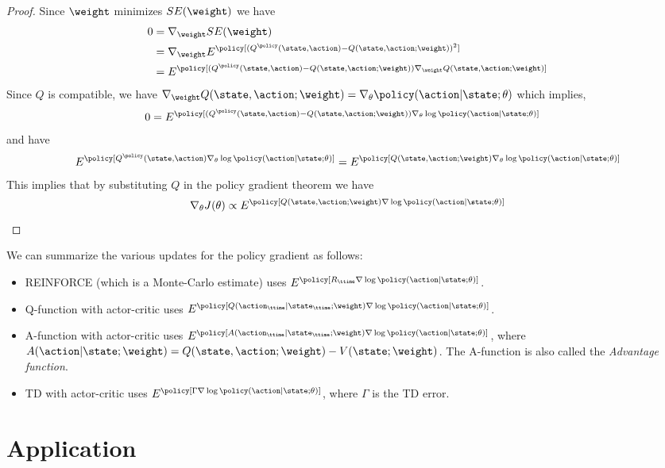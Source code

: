 \begin{proof}
Since $\weight$ minimizes $SE(\weight)$ we have
\begin{align*}
0 & = \nabla_\weight SE(\weight)\\
&= \nabla_\weight E^\policy[(Q^\policy(\state,\action)-Q(\state,\action;\weight))^2]\\
&=
E^\policy[(Q^\policy(\state,\action)-Q(\state,\action;\weight))\nabla_\weight
Q(\state,\action;\weight)]
\end{align*}
Since $Q$ is compatible, we have $\nabla_\weight
Q(\state,\action;\weight)= \nabla_\theta
\policy(\action|\state;\theta)$ which implies,
\begin{align*}
0&=
E^\policy[(Q^\policy(\state,\action)-Q(\state,\action;\weight))\nabla_\theta
\log \policy(\action|\state;\theta)]
\end{align*}
and have
\begin{align*}
 E^\policy[Q^\policy(\state,\action)\nabla_\theta \log \policy(\action|\state;\theta)] = E^\policy[Q(\state,\action;\weight)\nabla_\theta \log \policy(\action|\state;\theta)]
\end{align*}
This implies that by substituting $Q$ in the policy gradient theorem
we have
\[
\nabla_\theta J(\theta) \propto E^\policy[Q(\state,\action;\weight)
\nabla \log \policy(\action|\state;\theta)]
\]
\end{proof}

We can summarize the various updates for the policy gradient as
follows:
\begin{itemize}
\item REINFORCE (which is a Monte-Carlo estimate) uses
$E^\policy[R_\ttime \nabla\log\policy(\action|\state;\theta) ]$.
\item Q-function with actor-critic uses
$E^\policy[Q(\action_\ttime|\state_\ttime;\weight)
\nabla\log\policy(\action|\state;\theta) ]$.
\item A-function with actor-critic uses
$E^\policy[A(\action_\ttime|\state_\ttime;\weight)
\nabla\log\policy(\action|\state;\theta) ]$, where
$A(\action|\state;\weight)=Q(\state,\action;\weight)-V(\state;\weight)$. The A-function is also called the \emph{Advantage function}.
\item TD with actor-critic uses
$E^\policy[\Gamma\nabla\log\policy(\action|\state;\theta) ]$, where
$\Gamma$ is the TD error.
\end{itemize}

\section{Application}


